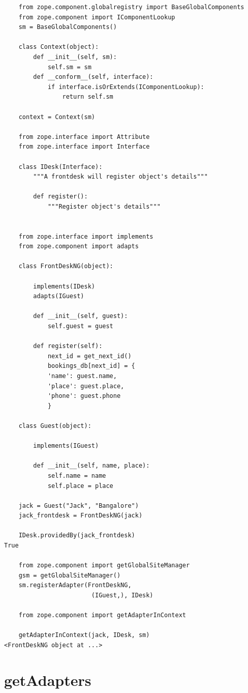 \documentclass[a4paper,openany,twoside,final]{book}
\begin{document}
\begin{verbatim}
    from zope.component.globalregistry import BaseGlobalComponents
    from zope.component import IComponentLookup
    sm = BaseGlobalComponents()

    class Context(object):
        def __init__(self, sm):
            self.sm = sm
        def __conform__(self, interface):
            if interface.isOrExtends(IComponentLookup):
                return self.sm

    context = Context(sm)

    from zope.interface import Attribute
    from zope.interface import Interface

    class IDesk(Interface):
        """A frontdesk will register object's details"""

        def register():
            """Register object's details"""


    from zope.interface import implements
    from zope.component import adapts

    class FrontDeskNG(object):

        implements(IDesk)
        adapts(IGuest)

        def __init__(self, guest):
            self.guest = guest

        def register(self):
            next_id = get_next_id()
            bookings_db[next_id] = {
            'name': guest.name,
            'place': guest.place,
            'phone': guest.phone
            }

    class Guest(object):

        implements(IGuest)

        def __init__(self, name, place):
            self.name = name
            self.place = place

    jack = Guest("Jack", "Bangalore")
    jack_frontdesk = FrontDeskNG(jack)

    IDesk.providedBy(jack_frontdesk)
True

    from zope.component import getGlobalSiteManager
    gsm = getGlobalSiteManager()
    sm.registerAdapter(FrontDeskNG,
                        (IGuest,), IDesk)

    from zope.component import getAdapterInContext

    getAdapterInContext(jack, IDesk, sm)
<FrontDeskNG object at ...>
\end{verbatim}


\section*{getAdapters%
  \label{getadapters}%
}
\end{document}
